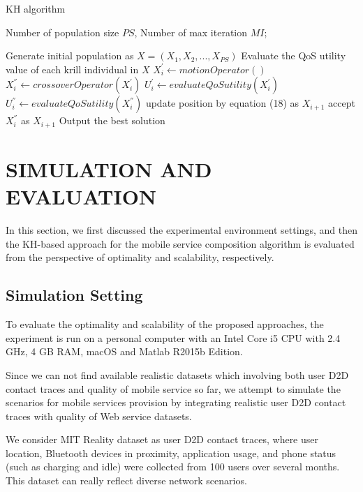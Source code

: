 \documentclass[10pt,journal,compsoc]{IEEEtran}
\begin{document}
\begin{algorithm}
\caption{KH algorithm}
\label{alg2}
\begin{algorithmic}[1]

\REQUIRE Number of population size $PS$, Number of max iteration $MI$;

\STATE Generate initial population as $X = (X_1, X_2, ..., X_{PS})$
\STATE Evaluate the QoS utility value of each krill individual in $X$
		\STATE $X_i^{'} \leftarrow motionOperator()$
		\STATE $X_i^{''} \leftarrow crossoverOperator(X_i^{'})$
		\STATE $U_i^{'} \leftarrow evaluateQoSutility(X_i^{'})$
		\STATE $U_i^{''} \leftarrow evaluateQoSutility(X_i^{''})$
			\STATE update position by equation (18) as $X_{i+1}$
		\ELSE
			\STATE accept $X_i^{''}$ as $X_{i+1}$
		\ENDIF
	\ENDFOR
\ENDFOR
\STATE Output the best solution
\end{algorithmic}
\end{algorithm}

\section{SIMULATION AND EVALUATION}
In this section, we first discussed the experimental environment settings, and then the KH-based approach for the mobile service composition algorithm is evaluated from the perspective of optimality and scalability, respectively.
\subsection{Simulation Setting}
To evaluate the optimality and scalability of the proposed approaches, the experiment is run on a personal computer with an Intel Core i5 CPU with 2.4 GHz, 4 GB RAM, macOS and Matlab R2015b Edition.

Since we can not find available realistic datasets which involving both user D2D contact traces and quality of mobile service so far, we attempt to simulate the scenarios for mobile services provision by integrating realistic user D2D contact traces with quality of Web service datasets. 

We consider MIT Reality dataset \cite{eagle2006reality} as user D2D contact traces, where user location, Bluetooth devices in proximity, application usage, and phone status (such as charging and idle) were collected from 100 users over several months. This dataset can really reflect diverse network scenarios.
\end{document}
